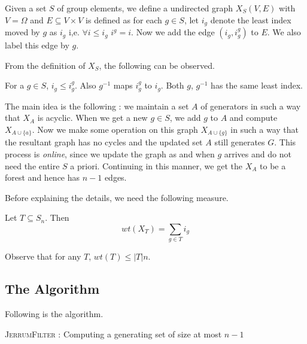 Given a set $S$ of group elements, we define a undirected graph $X_S(V,E)$ with
$V= \Omega$ and $E \subseteq V \times V$ is defined as for each $g \in S$, let
$i_g$ denote the least index moved by $g$ as $i_g$ i,e.  $\forall i \le i_g$
$i^g = i$.  Now we add the edge $(i_g,i_g^g)$ to $E$. We also 
label this edge by $g$. 

From the definition of $X_S$, the following can be observed.
\begin{observation}
	For a $g \in S$, $i_g \le i_g^g$. Also $g^{-1}$ maps $i_g^g$ to $i_g$.
	Both $g$, $g^{-1}$ has the same least index. 
\end{observation}
The main idea is the following : we maintain a set $A$ of generators in such a
way that $X_A$ is acyclic. When we get a new $g \in S$, we add $g$ to $A$ and
compute $X_{A \cup \{a\}}$. Now we make some operation on this graph 
$X_{A \cup \{g\}}$ in such a way that the resultant graph has no cycles and
the updated set $A$ still generates $G$. This process is \emph{online},
since we update the graph as and when $g$ arrives and do not need the entire
$S$ a priori. Continuing in this manner, we get the $X_A$ to be a forest and
hence has $n-1$ edges.

Before explaining the details, we need the following measure.
\begin{definition}[Weight of $T$]
	Let $T \subseteq S_n$. Then \[ wt(X_T )=\sum_{g \in T} i_g \]
\end{definition}
Observe that for any $T$, $wt(T) \le |T|n$.

\newpage
\subsection{The Algorithm}
Following is the algorithm.
\begin{algorithm}[htp!]
\caption{\textsc{JerrumFilter} : Computing a generating set of size at most
$n-1$}
\label{alg:jerfilter}
\begin{algorithmic}[1] 
		 \label{step:cyc}
		\EndIf
	\EndFor
\EndProcedure
\end{algorithmic}
\end{algorithm}

